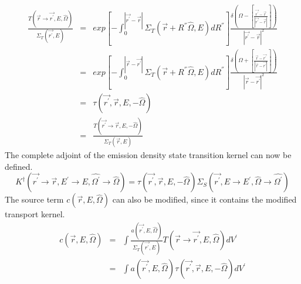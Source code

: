 \begin{eqnarray}
  \frac{T(\vec{r} \to \vec{r^{'}},E,\hat{\Omega})}{\Sigma_T(\vec{r^{'}},E)} & = &
  exp\left[-\int_0^{|\vec{r^{'}} - \vec{r}|} 
    \Sigma_T \left(\vec{r} + R^{''}\hat{\Omega},E \right) dR^{''} 
    \right] \frac{\delta \left(\Omega - \left[\frac{\vec{r^{'}} - \vec{r}}
      {|\vec{r^{'}} - \vec{r}|}\right]\right)}
       {|\vec{r^{'}} - \vec{r}|^2} \nonumber \\
       & = & exp\left[-\int_0^{|\vec{r} - \vec{r^{'}}|} 
    \Sigma_T \left(\vec{r} + R^{''}\hat{\Omega},E \right) dR^{''} 
    \right] \frac{\delta \left(\Omega + \left[\frac{\vec{r} - \vec{r^{'}}}
      {|\vec{r} - \vec{r^{'}}|}\right]\right)}
       {|\vec{r} - \vec{r^{'}}|^2} \nonumber \\
       & = & \tau(\vec{r^{'}},\vec{r},E,-\hat{\Omega}) \\
       & = & \frac{T(\vec{r^{'}} \to \vec{r},E,-\hat{\Omega})}
       {\Sigma_T(\vec{r},E)}
\end{eqnarray}
The complete adjoint of the emission density state transition kernel can now be 
defined.
\begin{equation}
  K^{\dagger}(\vec{r^{'}} \to \vec{r},E^{'} \to E,
  \hat{\Omega^{'}} \to \hat{\Omega}) = 
  \tau(\vec{r^{'}},\vec{r},E,-\hat{\Omega}) 
  \Sigma_S(\vec{r^{'}},E \to E^{'},\hat{\Omega} \to \hat{\Omega^{'}})
\end{equation}
The source term $c(\vec{r},E,\hat{\Omega})$ can also be modified, since it
contains the modified transport kernel.
\begin{eqnarray}
  c(\vec{r},E,\hat{\Omega}) & = & \int \frac{a(\vec{r^{'}},E,\hat{\Omega})}
  {\Sigma_T(\vec{r^{'}},E)}T(\vec{r} \to \vec{r^{'}},E,\hat{\Omega}) dV^{'} 
  \nonumber \\
  & = & \int a(\vec{r^{'}},E,\hat{\Omega}) 
  \tau(\vec{r^{'}},\vec{r},E,-\hat{\Omega}) dV^{'}
\end{eqnarray}

